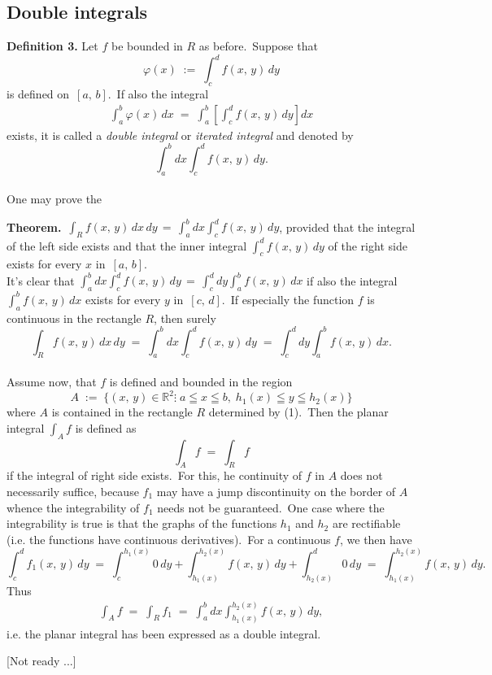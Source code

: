 \documentclass[12pt]{article}
\theoremstyle{definition}
\begin{document}
\subsection{Double integrals}
\textbf{Definition 3.}\; Let $f$ be bounded in $R$ as before.\, Suppose that
$$\varphi(x) \;:=\; \int_c^df(x,\,y)\,dy$$
is defined on\, $[a,\,b]$.\, If also the integral
\begin{align}
\int_a^b\varphi(x)\,dx \;=\; \int_a^b\left[\int_c^df(x,\,y)\,dy\right]dx
\end{align}
exists, it is called a \emph{double integral} or \emph{iterated integral} and denoted by
$$\int_a^bdx\int_c^df(x,\,y)\,dy.$$\\

One may prove the

\textbf{Theorem.}\, $\displaystyle\int_Rf(x,\,y)\,dx\,dy \,=\, \int_a^bdx\int_c^df(x,\,y)\,dy$,\; provided that the integral of the left side exists and that the inner integral $\int_c^df(x,\,y)\,dy$ of the right side exists for every $x$ in\, $[a,\,b]$.\\

It's clear that\; $\displaystyle\int_a^bdx\int_c^df(x,\,y)\,dy \,=\, \int_c^ddy\int_a^bf(x,\,y)\,dx$\; if also the integral $\int_a^bf(x,\,y)\,dx$ exists for every $y$ in\, $[c,\,d]$.\, If especially the function $f$ is continuous in the rectangle $R$, then surely
$$\int_Rf(x,\,y)\,dx\,dy \;=\; \int_a^bdx\int_c^df(x,\,y)\,dy \;=\; \int_c^ddy\int_a^bf(x,\,y)\,dx.$$\\

Assume now, that $f$ is defined and bounded in the region
$$A \;:=\; \{(x,\,y) \in \mathbb{R}^2\vdots\; a \leqq x \leqq b,\; h_1(x) \leqq y \leqq h_2(x)\}$$
where $A$ is contained in the rectangle $R$ determined by (1).\, Then the planar integral $\displaystyle\int_Af$ is defined as
$$\int_Af \;=\; \int_Rf$$
if the integral of right side exists.\, For this, he continuity of $f$ in $A$ does not necessarily suffice, because $f_1$ may have a jump discontinuity on the border of $A$ whence the integrability of $f_1$ needs not be guaranteed.\, One case where the integrability is true is that the graphs of the functions $h_1$ and $h_2$ are rectifiable (i.e. the functions have continuous derivatives).\, For a continuous $f$, we then have
$$\int_c^df_1(x,\,y)\,dy \;=\; \int_c^{h_1(x)}0\,dy +\int_{h_1(x)}^{h_2(x)}f(x,\,y)\,dy+\int_{h_2(x)}^d0\,dy 
\;=\; \int_{h_1(x)}^{h_2(x)}f(x,\,y)\,dy.$$
Thus
\begin{align}
\int_Af \;=\; \int_Rf_1 \;=\; \int_a^bdx\int_{h_1(x)}^{h_2(x)}f(x,\,y)\,dy,
\end{align}
i.e. the planar integral has been expressed as a double integral.

[Not ready ...]

\end{document}
